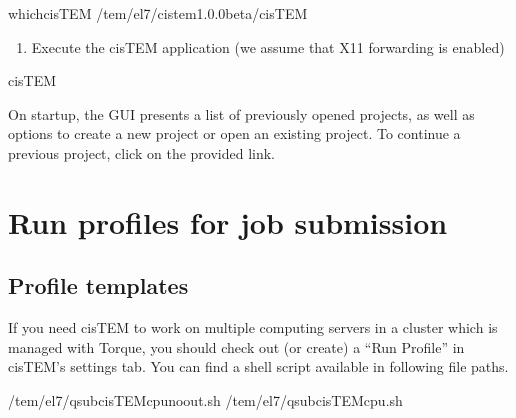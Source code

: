 \documentclass[a4paper,11pt,english]{sphinxmanual}
\begin{document}
\begin{sphinxVerbatim}[commandchars=\\\{\}]
\PYGZdl{}\PYGZgt{}whichcisTEM
/tem/el7/cistem\PYGZhy{}1.0.0\PYGZhy{}beta/cisTEM
\end{sphinxVerbatim}
\begin{enumerate}
%
\setcounter{enumi}{4}
\item {} 
\sphinxAtStartPar
Execute the cisTEM application (we assume that X11 forwarding is enabled)

\end{enumerate}

\begin{sphinxVerbatim}[commandchars=\\\{\}]
\PYGZdl{}\PYGZgt{}cisTEM
\end{sphinxVerbatim}


\sphinxAtStartPar
On startup, the GUI presents a list of previously opened projects, as well as options to create a new project or open an existing project.
To continue a previous project, click on the provided link.


\section{Run profiles for job submission}
\label{\detokenize{cisTEM:run-profiles-for-job-submission}}

\subsection{Profile templates}
\label{\detokenize{cisTEM:profile-templates}}
\sphinxAtStartPar
If you need cisTEM to work on multiple computing servers in a cluster which is managed with Torque, you should check out (or create) a “Run Profile” in cisTEM’s settings tab.
You can find a shell script available in following file paths.

\begin{sphinxVerbatim}[commandchars=\\\{\}]
/tem/el7/qsub\PYGZhy{}cisTEM\PYGZhy{}cpu\PYGZhy{}noout.sh
/tem/el7/qsub\PYGZhy{}cisTEM\PYGZhy{}cpu.sh
\end{sphinxVerbatim}
\end{document}
